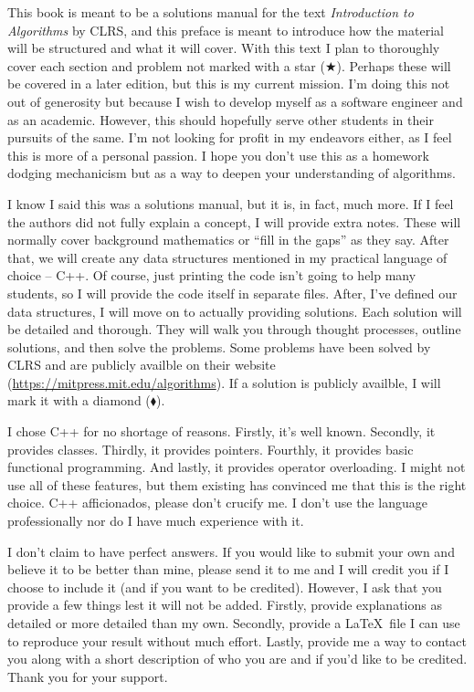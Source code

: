 \quad This book is meant to be a solutions manual for the text \emph{Introduction to Algorithms} by CLRS, and this 
preface is meant to introduce how the material will be structured and what it will cover. With this text I plan 
to thoroughly cover each section and problem not marked with a star ($\bigstar$). Perhaps these will be covered in
a later edition, but this is my current mission. I'm doing this not out of generosity but because I wish to 
develop myself as a software engineer and as an academic. However, this should hopefully serve other students 
in their pursuits of the same. I'm not looking for profit in my endeavors either, as I feel this is more of a 
personal passion. I hope you don't use this as a homework dodging mechanicism but as a way to deepen your 
understanding of algorithms.

    I know I said this was a solutions manual, but it is, in fact, much more. If I feel the authors did not fully 
explain a concept, I will provide extra notes. These will normally cover background mathematics or ``fill in the 
gaps'' as they say. After that, we will create any data structures mentioned in my practical language of choice 
-- C++. Of course, just printing the code isn't going to help many students, so I will provide the code itself 
in separate files. After, I've defined our data structures, I will move on to actually providing solutions. Each 
solution will be detailed and thorough. They will walk you through thought processes, outline solutions, and then 
solve the problems. Some problems have been solved by CLRS and are publicly availble on their website 
(\url{https://mitpress.mit.edu/algorithms}). If a solution is publicly availble, I will mark it with a diamond 
($\blacklozenge$).

    I chose C++ for no shortage of reasons. Firstly, it's well known. Secondly, it provides classes. 
Thirdly, it provides pointers. Fourthly, it provides basic functional programming. And lastly, it provides 
operator overloading. I might not use all of these features, but them existing has convinced me that this is the 
right choice. C++ afficionados, please don't crucify me. I don't use the language professionally nor do I have 
much experience with it. 


    I don't claim to have perfect answers. If you would like to submit your own and believe it to be better than
mine, please send it to me and I will credit you if I choose to include it (and if you want to be credited). 
However, I ask that you provide a few things lest it will not be added. Firstly, provide explanations as detailed 
or more detailed than my own. Secondly, provide a \LaTeX\ file I can use to reproduce your result without much 
effort. Lastly, provide me a way to contact you along with a short description of who you are and if you'd like 
to be credited. Thank you for your support.